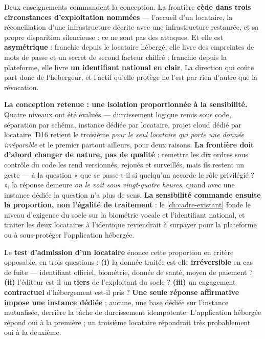 Deux enseignements commandent la conception. La frontière \textbf{cède dans trois circonstances
d'exploitation nommées} --- l'accueil d'un locataire, la réconciliation d'une infrastructure
décrite avec une infrastructure restaurée, et sa propre disparition silencieuse : ce ne sont pas
des attaques. Et elle est \textbf{asymétrique} : franchie depuis le locataire hébergé, elle livre
des empreintes de mots de passe et un secret de second facteur chiffré ; franchie depuis la
plateforme, elle livre \textbf{un identifiant national en clair}. La direction qui coûte part donc
de l'hébergeur, et l'actif qu'elle protège ne l'est par rien d'autre que la révocation.

\medskip
\noindent\textbf{La conception retenue : une isolation proportionnée à la sensibilité.}
Quatre niveaux ont été évalués --- durcissement logique remis sous code, séparation par schéma,
instance dédiée par locataire, projet cloud dédié par locataire. D16 retient le troisième
\emph{pour le seul locataire qui porte une donnée irréparable} et le premier partout ailleurs,
pour deux raisons. \textbf{La frontière doit d'abord changer de nature, pas de qualité} : remettre
les dix ordres sous contrôle du code les rend versionnés, rejoués et surveillés, mais ils restent
un geste --- à la question « que se passe-t-il si quelqu'un accorde le rôle privilégié ? », la
réponse demeure \emph{on le voit sous vingt-quatre heures}, quand avec une instance dédiée la
question n'a plus de sens. \textbf{La sensibilité commande ensuite la proportion, non l'égalité de
traitement} : le \cref{ch:cadre-existant} fonde le niveau d'exigence du socle sur la biométrie
vocale et l'identifiant national, et traiter les deux locataires à l'identique reviendrait à
surpayer pour la plateforme ou à sous-protéger l'application hébergée.

Le \textbf{test d'admission d'un locataire} énonce cette proportion en critère opposable, en trois
questions : \textbf{(i)} la donnée traitée est-elle \textbf{irréversible} en cas de fuite ---
identifiant officiel, biométrie, donnée de santé, moyen de paiement ? \textbf{(ii)} l'éditeur
est-il un \textbf{tiers} de l'exploitant du socle ? \textbf{(iii)} un engagement
\textbf{contractuel} d'hébergement est-il pris ? \textbf{Une seule réponse affirmative impose une
instance dédiée} ; aucune, une base dédiée sur l'instance mutualisée, derrière la tâche de
durcissement idempotente. L'application hébergée répond oui à la première ; un troisième locataire
répondrait très probablement oui à la deuxième.

